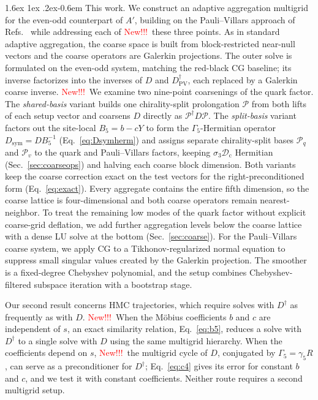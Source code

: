 \documentclass[11pt,a4paper]{article}
\makeatletter
\newif\ifshownew \shownewtrue
\DeclareRobustCommand\New{\ifshownew\textcolor{red}{New!!!}\ \else\ignorespaces\fi}
\renewcommand\paragraph{\@startsection{paragraph}{4}{\z@}%
  {1.6ex \@plus 1ex \@minus .2ex}{-0.6em}%
  {\normalfont\normalsize\itshape}}
\numberwithin{equation}{section}
\newcommand{\dg}{^{\dagger}}
\newcommand{\Dpv}{D_{\mathrm{PV}}}
\newcommand{\Gfive}{\Gamma_5}
\newcommand{\Pro}{\mathcal P}
\newcommand{\Pq}{\Pro_q}
\newcommand{\Pv}{\Pro_v}
\newcommand{\Dc}{\mathcal D_{\mathrm c}}
\newcommand{\Dsym}{D_{\mathrm{sym}}}
\newif\ifresults
\makeatother
\begin{document}
\paragraph{This work.}
We construct an adaptive aggregation multigrid~\cite{Brannick,DDalphaAMG,BridgeMG} for the even-odd
counterpart of $A'$, building on the Pauli--Villars approach of Refs.~\cite{BCHW,BY} while
addressing each of \New these three points. As in standard adaptive aggregation, the
coarse space is built from block-restricted near-null vectors and the coarse operators are Galerkin
projections. The outer solve is formulated on the even-odd system, matching the red-black CG
baseline; its inverse factorizes into the inverses of $D$ and $\Dpv\dg$, each replaced by a
Galerkin coarse inverse. \New We examine two nine-point coarsenings of the quark factor. The
\emph{shared-basis} variant builds one chirality-split prolongation $\Pro$ from both lifts of each
setup vector and coarsens $D$ directly as $\Pro\dg D\Pro$. The \emph{split-basis} variant factors
out the site-local $B_5=b-cY$ to form the $\Gfive$-Hermitian operator $\Dsym=DB_5^{-1}$
(Eq.~\eqref{eq:Dsymherm}) and assigns separate chirality-split bases $\Pq$ and $\Pv$ to the quark
and Pauli--Villars factors, keeping $\sigma_3\Dc$ Hermitian (Sec.~\ref{sec:coarseops}) and halving
each coarse block dimension. Both variants keep the coarse correction exact on the test vectors for
the right-preconditioned form (Eq.~\eqref{eq:exact}). Every aggregate contains the entire fifth dimension, so the coarse lattice
is four-dimensional and both coarse operators remain nearest-neighbor. To treat the remaining low
modes of the quark factor without explicit coarse-grid deflation, we add further aggregation levels
below the coarse lattice with a dense LU solve at the bottom (Sec.~\ref{sec:coarse}). For the Pauli--Villars coarse
system, we apply CG to a Tikhonov-regularized normal equation to suppress small singular values
created by the Galerkin projection. The smoother is
a fixed-degree Chebyshev polynomial, and the setup combines Chebyshev-filtered subspace iteration
with a bootstrap stage.

Our second result concerns HMC trajectories, which require solves with $D\dg$ as frequently as with
$D$. \New When the M\"obius coefficients $b$ and $c$ are independent of $s$, an
exact similarity relation, Eq.~\eqref{eq:b5}, reduces a solve with $D\dg$ to a single solve with
$D$ using the same multigrid hierarchy. When the coefficients depend on $s$, \New the multigrid cycle of $D$, conjugated by
$\Gfive=\gamma_5R$, can serve as a preconditioner for $D\dg$; Eq.~\eqref{eq:c4} gives its error
for constant $b$ and $c$, and we test it with constant coefficients. Neither route requires a second multigrid setup.\ifresults{} We benchmark the method on
quenched gauge configurations ranging from $12^4$ to $24^3\times48$ on a single GPU against
even-odd CGNE \New without deflation.\fi
\end{document}
